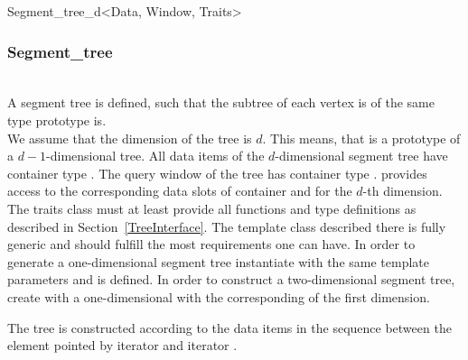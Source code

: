 \begin{ccClassTemplate} {Segment_tree_d<Data, Window, Traits>}
\subsubsection{Segment\_tree}
\label{SegmentTree}

\ccTypes
{}

\ccCreation
{}
\\
%
{A segment tree is defined, such that the subtree of  each
  vertex is of the   same type prototype
 is.\\
We assume that the dimension of the tree is $d$. This means, that
 is a  prototype of a $d-1$-dimensional
tree. All data items of the $d$-dimensional segment tree
  have container type . The query window of the
  tree has container type
  . 
 provides access to the corresponding data slots of container
  and   for the $d$-th
 dimension. The traits class 
 must at least provide all functions and type definitions
 as described in Section~\ref{TreeInterface}.
The template class
 described there is fully generic and should fulfill the most
 requirements one can have.
In order
  to generate a one-dimensional segment tree instantiate %
  with the same template parameters  and
    is defined. In
  order to construct a two-dimensional segment tree, create
   with
   a one-dimensional  with the
  corresponding  of the first dimension.\\
  }

\ccOperations

{The tree is constructed according to the data items in the
  sequence between the element pointed by iterator  and
  iterator .}




\end{ccClassTemplate}
